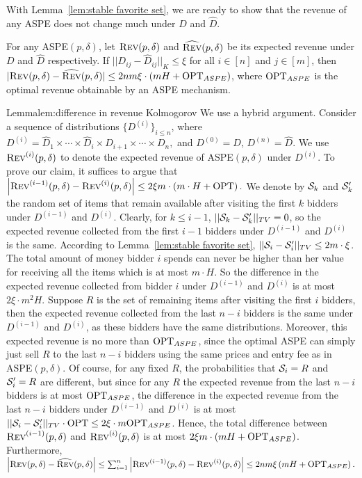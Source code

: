 {With Lemma~\ref{lem:stable favorite set}, we are ready to show that the revenue of any ASPE does not change much under $D$ and $\hat{D}$.\begin{lemma}\label{lem:difference in revenue Kolmogorov}
	For any ASPE$(p,\delta)$, let $\textsc{Rev}(p,\delta)$ and $\widehat{\textsc{Rev}}(p,\delta)$ be its expected revenue under $D$ and $\hat{D}$ respectively. If $||D_{ij}-\hat{D}_{ij}||_K\leq \xi$ for all $i\in[n]$ and $j\in[m]$, then $|\textsc{Rev}(p,\delta)-\widehat{\textsc{Rev}}(p,\delta)|\leq 2nm\xi\cdot \left(mH+\text{OPT}_{ASPE}\right)$,
	{where $\text{OPT}_{ASPE}$ is the optimal revenue obtainable by an ASPE mechanism.}
	\end{lemma}
\begin{prevproof}{Lemma}{lem:difference in revenue Kolmogorov}
	We use a hybrid argument. Consider a sequence of distributions $\{D^{(i)}\}_{i\leq n}$, where $D^{(i)}=\hat{D}_1\times\cdots\times\hat{D}_i\times D_{i+1}\times\cdots\times D_{n},$ and $D^{(0)}=D$, $D^{(n)}=\hat{D}$.
	 We use $\textsc{Rev}^{(i)}(p,\delta)$ to denote the expected revenue of ASPE$(p,\delta)$ under $D^{(i)}$. To prove our claim, it suffices to argue that $\left|\textsc{Rev}^{(i-1)}(p,\delta) -\textsc{Rev}^{(i)}(p,\delta)\right|\leq 2\xi m\cdot \left(m\cdot H+\text{OPT}\right).$
	  We denote by ${\mathcal{S}}_k$ and ${\mathcal{S}}'_k$ the random set of items that remain available after visiting the first $k$ bidders under $D^{(i-1)}$ and $D^{(i)}$. Clearly, for $k\leq i-1$, $||{\mathcal{S}}_k-{\mathcal{S}}'_k||_{TV}=0$, so the expected revenue collected from the first $i-1$ bidders under $D^{(i-1)}$ and $D^{(i)}$ is the same. According to Lemma~\ref{lem:stable favorite set}, $||{\mathcal{S}}_i-{\mathcal{S}}'_i||_{TV}\leq 2m\cdot \xi$. The total amount of money bidder $i$ spends can never be higher than her value for receiving all the items which is at most $m\cdot H$. So the difference in the expected revenue collected from bidder $i$ under  $D^{(i-1)}$ and $D^{(i)}$ is at most $2\xi\cdot m^2H$. Suppose $R$ is the set of remaining items after visiting the first $i$ bidders, then the expected revenue collected from the last $n-i$ bidders is the same under  $D^{(i-1)}$ and $D^{(i)}$, as these bidders have the same distributions. Moreover, this expected revenue is no more than $\text{OPT}_{ASPE}$, since the optimal ASPE can simply just sell $R$ to the last $n-i$ bidders using the same prices and entry fee as in ASPE$(p,\delta)$. Of course, for any fixed $R$, the probabilities that ${\mathcal{S}}_i=R$ and ${\mathcal{S}}'_i=R$ are different, but since for any $R$ the expected revenue from the last $n-i$ bidders is at most $\text{OPT}_{ASPE}$, the difference in the expected revenue from the last $n-i$ bidders under  $D^{(i-1)}$ and $D^{(i)}$ is at most $||{\mathcal{S}}_i-{\mathcal{S}}'_i||_{TV} \cdot \text{OPT} \leq 2\xi\cdot m\text{OPT}_{ASPE}$. Hence, the total difference between $\textsc{Rev}^{(i-1)}(p,\delta)$ and  $\textsc{Rev}^{(i)}(p,\delta)$ is at most $2\xi m\cdot \left(m H+\text{OPT}_{ASPE}\right)$. 
	  Furthermore, $\left|\textsc{Rev}(p,\delta)-\widehat{\textsc{Rev}}(p,\delta)\right|\leq \sum_{i=1}^{n}\left|\textsc{Rev}^{(i-1)}(p,\delta) -\textsc{Rev}^{(i)}(p,\delta)\right|\leq 2 nm\xi \left(mH+\text{OPT}_{ASPE}\right).$
\end{prevproof}

}
